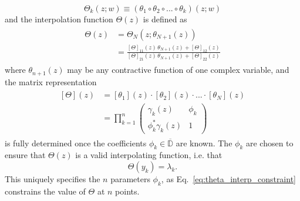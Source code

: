 \begin{equation}
    \Theta_k(z; w) \equiv (\theta_{1}\circ \theta_2\circ ...\circ \theta_k)(z; w)
\end{equation}
and the interpolation function $\Theta(z)$ is defined as
\begin{align} \begin{split}
    \Theta(z) &= \Theta_N(z; \theta_{N + 1}(z)) \\
    &= \frac{[\Theta]_{11}(z)\, \theta_{N + 1}(z) +  [\Theta]_{12}(z)}{[\Theta]_{21}(z)\, \theta_{N + 1}(z) +  [\Theta]_{22}(z)}
    \label{eq:schur_interp_solution}
\end{split} \end{align}
where $\theta_{n + 1}(z)$ may be any contractive function of one complex variable, and the matrix representation
\begin{align}
    \begin{split}
        [\Theta](z) &= [\theta_1](z) \cdot [\theta_2](z)\cdot ... \cdot [\theta_N](z) \\
        &= \prod_{k = 1}^n \begin{pmatrix}
        \gamma_k(z) & \phi_k \\
        \phi_k^* \gamma_k(z) & 1
    \end{pmatrix}
    \end{split}
\end{align}
is fully determined once the coefficients $\phi_k\in\overline{\mathbb D}$ are known. The $\phi_k$ are chosen to ensure that $\Theta(z)$ is a valid interpolating function, i.e. that 
\begin{equation}
    \Theta(y_k) = \lambda_k.
    \label{eq:theta_interp_constraint}
\end{equation}
This uniquely specifies the $n$ parameters $\phi_k$, as Eq.~\eqref{eq:theta_interp_constraint} constrains the value of $\Theta$ at $n$ points. 

